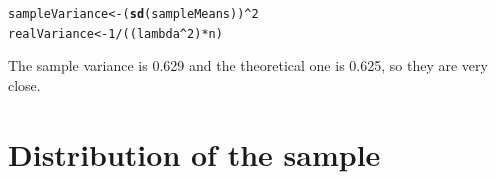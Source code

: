 \documentclass[10pt]{article}\usepackage[]{graphicx}\usepackage[]{color}
\makeatletter
\newcommand{\hlnum}[1]{\textcolor[rgb]{0.686,0.059,0.569}{#1}}%
\newcommand{\hlopt}[1]{\textcolor[rgb]{0,0,0}{#1}}%
\newcommand{\hlstd}[1]{\textcolor[rgb]{0.345,0.345,0.345}{#1}}%
\newcommand{\hlkwb}[1]{\textcolor[rgb]{0.69,0.353,0.396}{#1}}%
\newcommand{\hlkwd}[1]{\textcolor[rgb]{0.737,0.353,0.396}{\textbf{#1}}}%
\newenvironment{kframe}{%
 \def\at@end@of@kframe{}%
 \ifinner\ifhmode%
  \def\at@end@of@kframe{\end{minipage}}%
  \begin{minipage}{\columnwidth}%
 \fi\fi%
 \def\FrameCommand##1{\hskip\@totalleftmargin \hskip-\fboxsep
 \colorbox{shadecolor}{##1}\hskip-\fboxsep
     \hskip-\linewidth \hskip-\@totalleftmargin \hskip\columnwidth}%
 \MakeFramed {\advance\hsize-\width
   \@totalleftmargin\z@ \linewidth\hsize
   \@setminipage}}%
 {\par\unskip\endMakeFramed%
 \at@end@of@kframe}
\newenvironment{knitrout}{}{} %
\makeatother
\begin{document}
\begin{knitrout}
\color{fgcolor}\begin{kframe}
\begin{alltt}
\hlstd{sampleVariance} \hlkwb{<-} \hlstd{(}\hlkwd{sd}\hlstd{(sampleMeans))}\hlopt{^}\hlnum{2}
\hlstd{realVariance} \hlkwb{<-} \hlnum{1}\hlopt{/}\hlstd{((lambda}\hlopt{^}\hlnum{2}\hlstd{)}\hlopt{*}\hlstd{n)}
\end{alltt}
\end{kframe}
\end{knitrout}

The sample variance is 0.629
and the theoretical one is 0.625, so they are  very close.

\section{Distribution of the sample}
\end{document}
